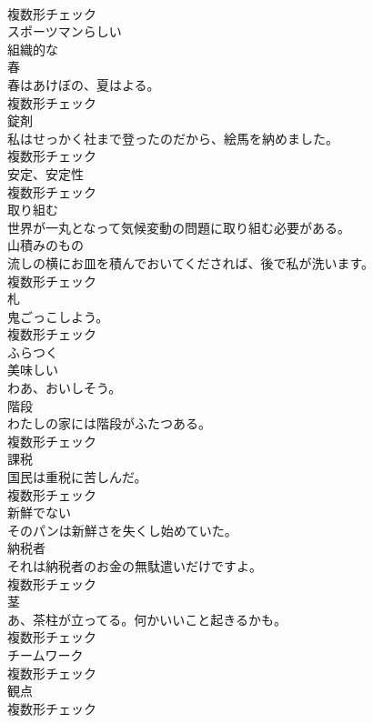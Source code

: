 \documentclass[8pt]{extreport}
\begin{document}
\begin{CJK}{UTF8}{min}
\\	複数形チェック
\\	[形容詞]	スポーツマンらしい	
\\	[形容詞]	組織的な	
\\	[名詞]	春	
\\	春はあけぼの、夏はよる。	
\\	複数形チェック
\\	[名詞]	錠剤	
\\	私はせっかく社まで登ったのだから、絵馬を納めました。	
\\	複数形チェック
\\	[名詞]	安定、安定性	
\\	複数形チェック
\\	[動詞]	取り組む	
\\	世界が一丸となって気候変動の問題に取り組む必要がある。	
\\	[名詞]	山積みのもの	
\\	流しの横にお皿を積んでおいてくだされば、後で私が洗います。	
\\	複数形チェック
\\	[名詞]	札	
\\	鬼ごっこしよう。	
\\	複数形チェック
\\	[動詞]	ふらつく	
\\	[形容詞]	美味しい	
\\	わあ、おいしそう。	
\\	[名詞]	階段	
\\	わたしの家には階段がふたつある。	
\\	複数形チェック
\\	[名詞]	課税	
\\	国民は重税に苦しんだ。	
\\	複数形チェック
\\	[形容詞]	新鮮でない	
\\	そのパンは新鮮さを失くし始めていた。	
\\	[名詞]	納税者	
\\	それは納税者のお金の無駄遣いだけですよ。	
\\	複数形チェック
\\	[名詞]	茎	
\\	あ、茶柱が立ってる。何かいいこと起きるかも。	
\\	複数形チェック
\\	[名詞]	チームワーク	
\\	複数形チェック
\\	[名詞]	観点	
\\	複数形チェック

\end{CJK}
\end{document}
